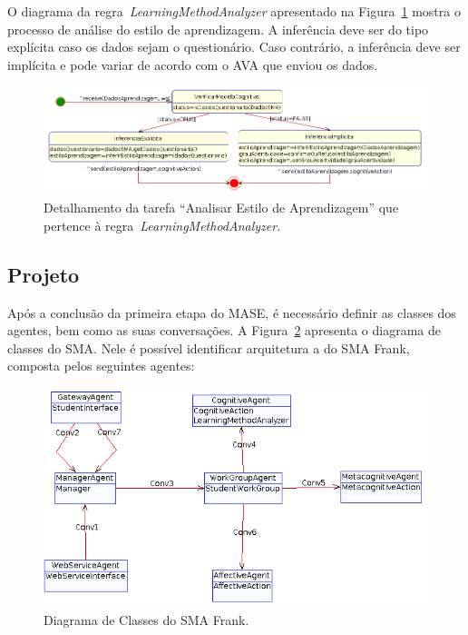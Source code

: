 O diagrama da regra~\emph{LearningMethodAnalyzer} apresentado na Figura~\ref{fig:td-analise-aprendizagem} mostra o processo de análise do estilo de aprendizagem. A inferência deve ser do tipo explícita caso os dados sejam o questionário. Caso contrário, a inferência deve ser implícita e pode variar de acordo com o AVA que enviou os dados.
\begin{figure}
	\centering
	\includegraphics[scale=0.48]{images/td-analise-aprendizagem.png}
	\caption{Detalhamento da tarefa ``Analisar Estilo de Aprendizagem'' que pertence à regra~\emph{LearningMethodAnalyzer}.}
	\label{fig:td-analise-aprendizagem}
\end{figure}

\subsection{Projeto}\label{subsection:design}

Após a conclusão da primeira etapa do MASE, é necessário definir as classes dos agentes, bem como as suas conversações. A Figura~\ref{fig:agent-class-diagram} apresenta o diagrama de classes do SMA. Nele é possível identificar arquitetura a do SMA Frank, composta pelos seguintes agentes:

\begin{figure}
	\centering
	\includegraphics[scale=0.48]{images/agent-class-diagram.png}
	\caption{Diagrama de Classes do SMA Frank.}
	\label{fig:agent-class-diagram}
\end{figure}

